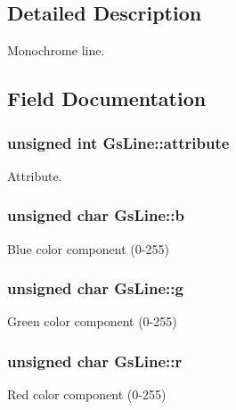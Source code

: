 \subsection{Detailed Description}
Monochrome line. 

\subsection{Field Documentation}
\hypertarget{structGsLine_ae6c49c59ee6587c941678ecb2a11dbe7}{}
\subsubsection[{attribute}]{\setlength{\rightskip}{0pt plus 5cm}unsigned int Gs\+Line\+::attribute}\label{structGsLine_ae6c49c59ee6587c941678ecb2a11dbe7}


Attribute. 

\hypertarget{structGsLine_a99701c888c36ce7e0f4cf9133949d305}{}
\subsubsection[{b}]{\setlength{\rightskip}{0pt plus 5cm}unsigned char Gs\+Line\+::b}\label{structGsLine_a99701c888c36ce7e0f4cf9133949d305}


Blue color component (0-\/255) 

\hypertarget{structGsLine_a266688a62e598c2240daf3f207a95057}{}
\subsubsection[{g}]{\setlength{\rightskip}{0pt plus 5cm}unsigned char Gs\+Line\+::g}\label{structGsLine_a266688a62e598c2240daf3f207a95057}


Green color component (0-\/255) 

\hypertarget{structGsLine_a382e46657bca42b20566e51ce1650673}{}
\subsubsection[{r}]{\setlength{\rightskip}{0pt plus 5cm}unsigned char Gs\+Line\+::r}\label{structGsLine_a382e46657bca42b20566e51ce1650673}


Red color component (0-\/255) 


